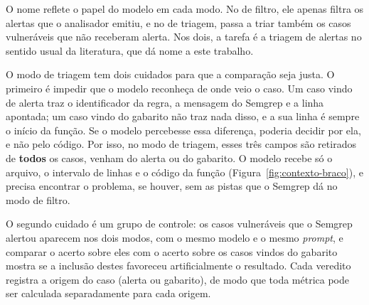 O nome reflete o papel do modelo em cada modo. No de filtro, ele apenas filtra os alertas que o analisador emitiu, e no de triagem, passa a triar também os casos vulneráveis que não receberam alerta. Nos dois, a tarefa é a triagem de alertas no sentido usual da literatura, que dá nome a este trabalho.

O modo de triagem tem dois cuidados para que a comparação seja justa. O primeiro é impedir que o modelo reconheça de onde veio o caso. Um caso vindo de alerta traz o identificador da regra, a mensagem do Semgrep e a linha apontada; um caso vindo do gabarito não traz nada disso, e a sua linha é sempre o início da função. Se o modelo percebesse essa diferença, poderia decidir por ela, e não pelo código. Por isso, no modo de triagem, esses três campos são retirados de \textbf{todos} os casos, venham do alerta ou do gabarito. O modelo recebe só o arquivo, o intervalo de linhas e o código da função (Figura~\ref{fig:contexto-braco}), e precisa encontrar o problema, se houver, sem as pistas que o Semgrep dá no modo de filtro.

O segundo cuidado é um grupo de controle: os casos vulneráveis que o Semgrep alertou aparecem nos dois modos, com o mesmo modelo e o mesmo \textit{prompt}, e comparar o acerto sobre eles com o acerto sobre os casos vindos do gabarito mostra se a inclusão destes favoreceu artificialmente o resultado. Cada veredito registra a origem do caso (alerta ou gabarito), de modo que toda métrica pode ser calculada separadamente para cada origem.

